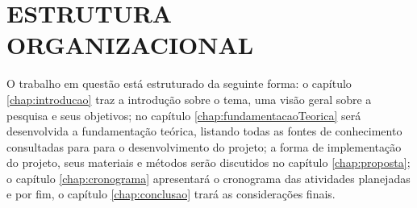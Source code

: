 \section{ESTRUTURA ORGANIZACIONAL}

O trabalho em questão está estruturado da seguinte forma: o capítulo \ref{chap:introducao} traz a introdução sobre o tema, uma visão geral sobre a pesquisa e seus objetivos; no capítulo \ref{chap:fundamentacaoTeorica} será desenvolvida a fundamentação teórica, listando todas as fontes de conhecimento consultadas para para o desenvolvimento do projeto; a forma de implementação do projeto, seus materiais e métodos serão discutidos no capítulo \ref{chap:proposta}; o capítulo \ref{chap:cronograma} apresentará o cronograma das atividades planejadas e por fim, o capítulo \ref{chap:conclusao} trará as considerações finais.

